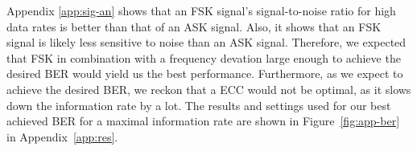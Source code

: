\documentclass[11pt,titlepage]{report}
\begin{document}
Appendix \ref{app:sig-an} shows that an FSK signal's signal-to-noise ratio for high data rates is better than that of an ASK signal. Also, it shows that an FSK signal is likely less sensitive to noise than an ASK signal. Therefore, we expected that FSK in combination with a frequency devation large enough to achieve the desired BER would yield us the best performance. Furthermore, as we expect to achieve the desired BER, we reckon that a ECC would not be optimal, as it slows down the information rate by a lot. The results and settings used for our best achieved BER for a maximal information rate are shown in Figure~\ref{fig:app-ber} in Appendix~\ref{app:res}.
\end{document}
